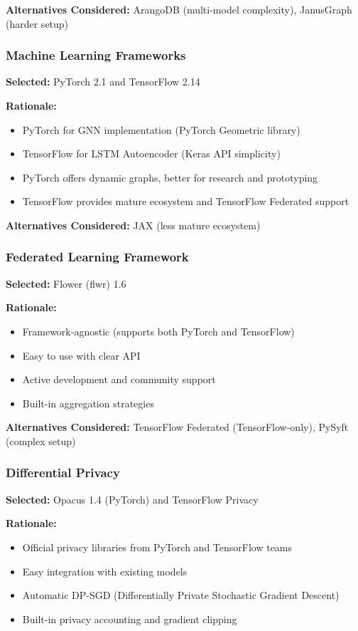 \documentclass[12pt,a4paper]{article}
\begin{document}
\textbf{Alternatives Considered:} ArangoDB (multi-model complexity), JanusGraph (harder setup)

\subsubsection{Machine Learning Frameworks}

\textbf{Selected:} PyTorch 2.1 and TensorFlow 2.14

\textbf{Rationale:}
\begin{itemize}[leftmargin=1cm,itemsep=0pt]
    \item PyTorch for GNN implementation (PyTorch Geometric library)
    \item TensorFlow for LSTM Autoencoder (Keras API simplicity)
    \item PyTorch offers dynamic graphs, better for research and prototyping
    \item TensorFlow provides mature ecosystem and TensorFlow Federated support
\end{itemize}

\textbf{Alternatives Considered:} JAX (less mature ecosystem)

\subsubsection{Federated Learning Framework}

\textbf{Selected:} Flower (flwr) 1.6

\textbf{Rationale:}
\begin{itemize}[leftmargin=1cm,itemsep=0pt]
    \item Framework-agnostic (supports both PyTorch and TensorFlow)
    \item Easy to use with clear API
    \item Active development and community support
    \item Built-in aggregation strategies
\end{itemize}

\textbf{Alternatives Considered:} TensorFlow Federated (TensorFlow-only), PySyft (complex setup)

\subsubsection{Differential Privacy}

\textbf{Selected:} Opacus 1.4 (PyTorch) and TensorFlow Privacy

\textbf{Rationale:}
\begin{itemize}[leftmargin=1cm,itemsep=0pt]
    \item Official privacy libraries from PyTorch and TensorFlow teams
    \item Easy integration with existing models
    \item Automatic DP-SGD (Differentially Private Stochastic Gradient Descent)
    \item Built-in privacy accounting and gradient clipping
\end{itemize}
\end{document}
